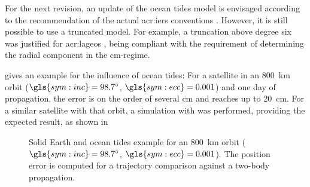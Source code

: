 For the next revision, an update of the ocean tides model is envisaged according
to the recommendation of the actual \gls{acr:iers} conventions \citep{luzum2010}. However, it is still possible to use a truncated model. For example, a truncation above degree six
was justified for \gls{acr:lageos} \citep{seidelmann2006}, being compliant with the requirement of determining the radial component in the cm-regime.

\citet{luzum2010} gives an example for the influence of ocean tides: For a satellite in an \SI{800}{\kilo\metre} orbit ($\gls{sym:inc}=\ang{98.7;;}$, $\gls{sym:ecc}=0.001$) and
one day of propagation, the error is on the order of several \si{\centi\metre} and reaches up to \SI{20}{\centi\metre}. For a similar satellite with that orbit, a simulation with
\neptune was performed, providing the expected result, as shown in 

\begin{figure}[h!]
 \centering
 
 \caption{Solid Earth and ocean tides example for an \SI{800}{\kilo\metre} orbit ($\gls{sym:inc}=\ang{98.7;;}$, $\gls{sym:ecc}=0.001$). The position error is computed for a
trajectory comparison against a two-body propagation.\label{fig:tides-example}}
\end{figure}

%
